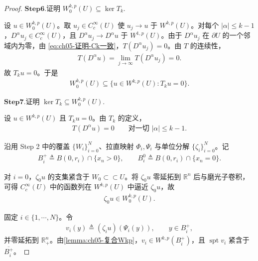 \begin{proof}
\noindent$\mathbf{Step}\mathbf{6}.${\heiti 证明 $W^{k,p}_{0}(U)\subseteq\ker T_{k}$.}

设 $u\in W^{k,p}_{0}(U)$。取 $u_{j}\in C^{\infty}_{c}(U)$ 使 $u_{j}\to u$ 于 $W^{k,p}(U)$。对每个 $|\alpha|\leqslant k-1$，$D^{\alpha}u_{j}\in C^{\infty}_{c}(U)$，且 $D^{\alpha}u_{j}\to D^{\alpha}u$ 于 $W^{1,p}(U)$。由于 $D^{\alpha}u_{j}$ 在 $\partial U$ 的一个邻域内为零，由 \eqref{eq:ch05-证明-Ck一致}，$T(D^{\alpha}u_{j})=0$。由 $T$ 的连续性，
\begin{align*}
T(D^{\alpha}u)=\lim_{j\to\infty}T(D^{\alpha}u_{j})=0.
\end{align*}
故 $T_{k}u=0$。于是
\begin{align}
W^{k,p}_{0}(U)\subseteq\{u\in W^{k,p}(U):T_{k}u=0\}.
\label{eq:ch05-证明-包含1}
\end{align}

\noindent$\mathbf{Step}\mathbf{7}.${\heiti 证明 $\ker T_{k}\subseteq W^{k,p}_{0}(U)$.}

设 $u\in W^{k,p}(U)$ 且 $T_{k}u=0$。由 $T_{k}$ 的定义，
\begin{align}
T(D^{\alpha}u)=0
\qquad\text{对一切 }|\alpha|\leqslant k-1.
\label{eq:ch05-证明-导数零迹}
\end{align}

沿用 Step 2 中的覆盖 $\{W_{i}\}_{i=0}^{N}$、拉直映射 $\Phi_{i},\Psi_{i}$ 与单位分解 $\{\zeta_{i}\}_{i=0}^{N}$。记
\begin{align*}
B_{i}^{+}\triangleq B(0,r_{i})\cap\{x_{n}>0\},
\qquad
B_{i}^{0}\triangleq B(0,r_{i})\cap\{x_{n}=0\}.
\end{align*}

对 $i=0$，$\zeta_{0}u$ 的支集紧含于 $W_{0}\subset\subset U$。将 $\zeta_{0}u$ 零延拓到 $\mathbb{R}^{n}$ 后与磨光子卷积，可得 $C^{\infty}_{c}(U)$ 中的函数列在 $W^{k,p}(U)$ 中逼近 $\zeta_{0}u$，故
\begin{align}
\zeta_{0}u\in W^{k,p}_{0}(U).
\label{eq:ch05-证明-i0}
\end{align}

固定 $i\in\{1,\cdots,N\}$。令
\begin{align*}
v_{i}(y)\triangleq(\zeta_{i}u)(\Psi_{i}(y)),
\qquad y\in B_{i}^{+},
\end{align*}
并零延拓到 $\mathbb{R}^{n}_{+}$。由\cref{lemma:ch05-复合Wkp}，$v_{i}\in W^{k,p}(B_{i}^{+})$，且 $\operatorname{spt}v_{i}$ 紧含于 $\overline{B_{i}^{+}}$。


\end{proof}
